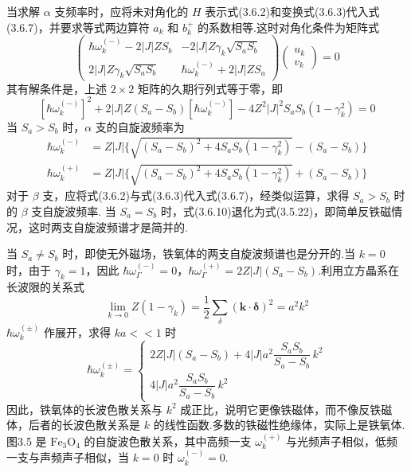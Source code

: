 当求解 $\alpha$ 支频率时，应将未对角化的 $H$
表示式(3.6.2)和变换式(3.6.3)代入式(3.6.7)，并要求等式两边算符 $a_k$ 和
$b_k^{+}$ 的系数相等.这时对角化条件为矩阵式
\begin{equation}
  \begin{pmatrix}
    \hbar\omega_k^{(-)}-2\left|J\right|ZS_b & -2\left|J\right|Z\gamma_k\sqrt{S_aS_b}\\
    2\left|J\right|Z\gamma_k\sqrt{S_aS_b} & \hbar\omega_k^{(-)}+2\left|J\right|ZS_a
  \end{pmatrix}
  \begin{pmatrix}u_k\\ v_k\end{pmatrix}=0
\end{equation}
其有解条件是，上述 $2\times2$ 矩阵的久期行列式等于零，即
\begin{equation}
  \left[\hbar\omega_k^{(-)}\right]^2+2\left|J\right|Z\left(S_a-S_b\right)\left[\hbar\omega_k^{(-)}\right]
  -4Z^2\left|J\right|^2S_aS_b\left(1-\gamma_k^2\right)=0
\end{equation}
当 $S_a>S_b$ 时，$\alpha$ 支的自旋波频率为
\begin{equation}
\begin{aligned}
  \hbar\omega_k^{(-)}&=Z\left|J\right|\bigl\{\sqrt{\left(S_a-S_b\right)^2
  +4S_aS_b\left(1-\gamma_k^2\right)}-\left(S_a-S_b\right)\bigr\}\\
  \hbar\omega_k^{(+)}&=Z\left|J\right|\bigl\{\sqrt{\left(S_a-S_b\right)^2
  +4S_aS_b\left(1-\gamma_k^2\right)}+\left(S_a-S_b\right)\bigr\}
\end{aligned}
\end{equation}
对于 $\beta$ 支，应将式(3.6.2)与式(3.6.3)代入式(3.6.7)，经类似运算，求得
$S_a>S_b$ 时的 $\beta$ 支自旋波频率.
当 $S_a=S_b$
时，式(3.6.10)退化为式(3.5.22)，即简单反铁磁情况，这时两支自旋波频谱才是简并的.

当 $S_a\neq
S_b$ 时，即使无外磁场，铁氧体的两支自旋波频谱也是分开的.当 $k=0$ 时，由于
$\gamma_k=1$，因此 $\hbar\omega_{\Gamma}^{(-)}=0$，$\hbar\omega_{\Gamma}^{(+)}
=2Z\left|J\right|\left(S_a-S_b\right)$.利用立方晶系在长波限的关系式
\begin{equation}
  \lim_{k\to0}Z\left(1-\gamma_k\right)=\frac{1}{2}\sum_\delta\left(\boldsymbol{k}\cdot\boldsymbol{\delta}\right)^2=a^2k^2
\end{equation}
$\hbar\omega_k^{(\pm)}$ 作展开，求得 $ka<\!<1$ 时
\begin{equation}
  \hbar\omega_k^{(\pm)}=
  \begin{cases}
    2Z\left|J\right|\left(S_a-S_b\right)+4\left|J\right|a^2\dfrac{S_aS_b}{S_a-S_b}\,k^2\\[0.8em]
    4\left|J\right|a^2\dfrac{S_aS_b}{S_a-S_b}\,k^2
  \end{cases}
\end{equation}
因此，铁氧体的长波色散关系与 $k^2$
成正比，说明它更像铁磁体，而不像反铁磁体，后者的长波色散关系是 $k$
的线性函数.多数的铁磁性绝缘体，实际上是铁氧体.图3.5 是
$\mathrm{Fe_3O_4}$
的自旋波色散关系，其中高频一支 $\omega_k^{(+)}$
与光频声子相似，低频一支与声频声子相似，当 $k=0$ 时 $\omega_k^{(-)}=0$.

